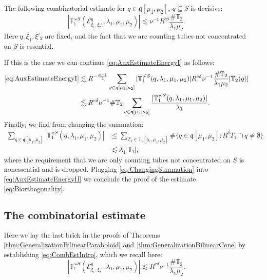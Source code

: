 \documentclass{amsart}
\theoremstyle{definition}
\newcommand{\T}{\mathbb{T}}
\begin{document}
\medskip

The following combinatorial estimate for $q \in \mathfrak{q}[\mu_1,\mu_2]$, $q \subseteq S$ is decisive:
\begin{equation}
\label{eq:CombEstIntro}
|\T_1^{\not\sim S}(\mathcal{E}^{q}_{\xi_1,\xi_2'},\lambda_1,\mu_1,\mu_2)| \lesssim \nu^{-1} R^{c \delta} \frac{\# \T_2}{\lambda_1 \mu_2}.
\end{equation}
Here $q, \xi_1, \xi'_2$ are fixed, and the fact that we are counting tubes not concentrated on $S$ is essential.

If this is the case we can continue \eqref{eq:AuxEstimateEnergyI} as follows:
\begin{equation}
\label{eq:AuxEstimateEnergyII}
\begin{split}
\eqref{eq:AuxEstimateEnergyI} &\lesssim R^{-\frac{d-1}{2}} \sum_{q \in \mathfrak{q}[\mu_1,\mu_2]}|\T^{\not\sim S}_1(q,\lambda_1,\mu_1,\mu_2)| R^{c \delta} \nu^{-1} \frac{\# \T_2}{\lambda_1 \mu_2} |\T_2(q)| \\
&\lesssim R^{c \delta} \nu^{-1} \# \T_2 \sum_{q\in \mathfrak{q}[\mu_1,\mu_2]} \frac{|\T^{\not\sim S}_1(q,\lambda_1,\mu_1,\mu_2)|}{\lambda_1}.
\end{split}
\end{equation}
Finally, we find from changing the summation:
\begin{equation}
\label{eq:ChangingSummation}
\begin{split}
\sum_{q \in \mathfrak{q}[\mu_1,\mu_2]} |\T_1^{\not\sim S}(q,\lambda_1,\mu_1,\mu_2)| &\leq \sum_{T_1 \in \T_1[\lambda_1,\mu_1,\mu_2]} \# \{ q \in \mathfrak{q}[\mu_1,\mu_2] : R^\delta T_1 \cap q \neq \emptyset \} \\ &\lesssim \lambda_1 |\T_1|,
\end{split}
\end{equation}
where the requirement that we are only counting tubes not concentrated on $S$ is nonessential and is dropped.
Plugging \eqref{eq:ChangingSummation} into \eqref{eq:AuxEstimateEnergyII} we conclude the proof of the estimate \eqref{eq:Biorthogonality}.

\subsection{The combinatorial estimate}
\label{subsection:CombinatorialEstimate}

Here we lay the last brick in the proofs of Theorems \ref{thm:GeneralizationBilinearParaboloid} and \ref{thm:GeneralizationBilinearCone} by establishing \eqref{eq:CombEstIntro}, which we recall here:
\begin{equation}
\label{eq:CombEst}
|\T_1^{\not\sim S}(\mathcal{E}^{q}_{\xi_1,\xi_2'},\lambda_1,\mu_1,\mu_2)| \lesssim R^{c \delta} \nu^{-1} \frac{\# \T_2}{\lambda_1 \mu_2}.
\end{equation}
\end{document}
